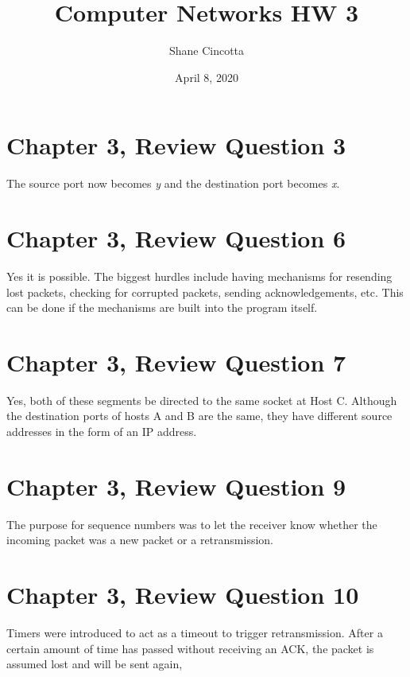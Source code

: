\documentclass{article}
\title{Computer Networks HW 3}
\author{Shane Cincotta }
\date{April 8, 2020}
\begin{document}
\maketitle

\section*{Chapter 3, Review Question 3}
The source port now becomes \textit{y} and the destination port becomes \textit{x}.\\

\section*{Chapter 3, Review Question 6}
Yes it is possible.  The biggest hurdles include having mechanisms for resending lost packets, checking for corrupted packets, sending acknowledgements, etc.  This can be done if the mechanisms are built into the program itself.\\

\section*{Chapter 3, Review Question 7}
Yes, both of these segments be directed to the same socket at Host C. Although the destination ports of hosts A and B are the same, they have different source addresses in the form of an IP address.\\

\section*{Chapter 3, Review Question 9}
The purpose for sequence numbers was to let the receiver know whether the incoming packet was a new packet or a retransmission.\\

\section*{Chapter 3, Review Question 10}
Timers were introduced to act as a timeout to trigger retransmission.  After a certain amount of time has passed without receiving an ACK, the packet is assumed lost and will be sent again,\\
\end{document}
